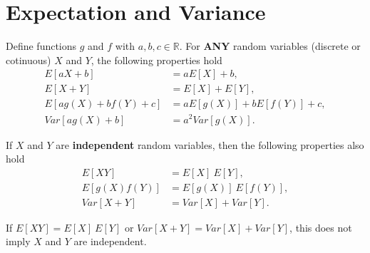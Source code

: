 \section{Expectation and Variance} \label{mod2:section:ExpectationVariance}

\begin{prop}

Define  functions $g$ and $f$ with $a, b, c \in \mathbb{R}$. For \textbf{ANY} random variables (discrete or cotinuous) $X$ and $Y$, the following properties hold
\begin{align}
E[aX + b] &= aE[X] + b, \\
E[X + Y] &= E[X] + E[Y], \\
E[ag(X) + bf(Y)  + c] &= aE[g(X) ]+ bE[f(Y)] + c, \\
Var[ag(X) + b] &= a^2Var[g(X)].
\end{align}

If $X$ and $Y$ are \textbf{independent} random variables, then the following properties also hold
\begin{align}
E[XY] &= E[X] \ E[Y], \\
E[g(X)f(Y)] &= E[g(X)] \ E[f(Y)], \\
Var[X + Y] &= Var[X]+ Var[Y].
\end{align}

\end{prop}

\begin{note} \label{mod2:note:Independence:Non-implication}
	
	If $E[XY] = E[X] \ E[Y]$ or $Var[X + Y] = Var[X]+ Var[Y]$, this does not imply $X$ and $Y$ are independent.
	
\end{note}



